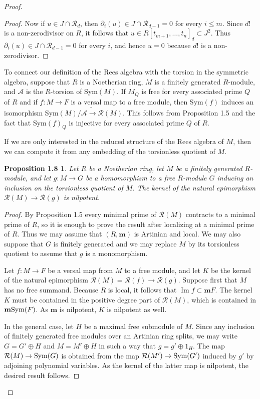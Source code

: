 \documentclass{proc-l}
\theoremstyle{plain}
\newtheorem*{theorem7}{Proposition 1.8}
\theoremstyle{definition}
\newcommand{\R}{\mathcal R}
\newcommand{\m}{\mathbf m}
\newcommand{\ra}{\rightarrow }
\newcommand{\Sym}{\hbox {\rm Sym}}
\begin{document}
\begin{proof}
\begin{proof}
Now if $u \in J \cap \R _{d}$, then $\partial _{i} (u) \in J \cap \R _{d-1}
= 0$ for every $i \le m$.  Since $d!$ is a non-zerodivisor on $R$,
it follows that $u \in R[t_{m+1}, \dots , t_{n}]_{d} \subset J^{2}$. Thus
$\partial _{i}(u) \in J \cap \R _{d-1} = 0$ for every $i$, and hence
$u = 0$ because $d!$ is a non-zerodivisor. \end{proof}


\smallskip To connect our definition of the Rees algebra with the torsion in
the symmetric algebra, suppose that $R$ is a Noetherian ring, $M$
is a finitely generated $R$-module, and $\mathcal{A}$ is the
$R$-torsion of Sym$(M)$.  If $M_{Q}$ is free for every associated
prime $Q$ of $R$ and if $f \colon M\to F$ is a versal map to a
free module, then Sym$(f)$ induces an isomorphism Sym$(M)/{\mathcal{A}}
\tilde {\ra } \R (M)$. This follows from Proposition 1.5 and the fact
that Sym$(f)_{Q}$ is injective for every associated prime $Q$ of
$R$.

If we are only interested in the reduced structure of the Rees
algebra of $M$, then we can compute it from any embedding of the
torsionless quotient of $M$.

\begin{theorem7} Let $R$ be a Noetherian ring, let $M$
be a finitely generated $R$-module, and let $g \colon M \to G$ be
a homomorphism to a free $R$-module $G$ inducing an inclusion on
the torsionless quotient of $M$.
The kernel of the natural epimorphism $\R (M)\to \R (g)$ is
nilpotent.
\end{theorem7}


\begin{proof} By Proposition 1.5 every minimal prime of $\R (M)$
contracts to a minimal prime of $R$, so  it is enough to prove the
result after localizing at a minimal prime of $R$. Thus we may
assume that $(R,\m )$ is Artinian and local. We may also suppose
that $G$ is finitely generated and we may replace $M$ by its
torsionless quotient to assume that $g$ is a monomorphism.

Let $f \colon M\to F$ be a versal map from $M$ to a free module,
and let $K$ be the kernel of the natural epimorphism
$\R (M)=\R (f)\to \R (g)$. Suppose first that $M$ has no free
summand. Because $R$ is local, it follows that $\operatorname{Im} f\subset \m F$. The kernel $K$ must be contained in the positive degree part
of $\R (M)$, which is contained in $\m \Sym (F)$. As $\m $ is
nilpotent, $K$ is nilpotent as well.

In the general case, let $H$ be a maximal free submodule of $M$.
Since any inclusion of finitely generated free modules over an
Artinian ring splits, we may write  $G=G'\oplus H$ and $M=M'\oplus H$ in such a way that $g=g'\oplus 1_{H}$. The map $\R (M)\to \Sym (G)$
is obtained from the map $\R (M')\to \Sym (G')$ induced by $g'$ by
adjoining polynomial variables. As the kernel of the latter map is
nilpotent, the desired result follows. \end{proof}
\renewcommand{\qed}{} \end{proof} 
\end{document}
